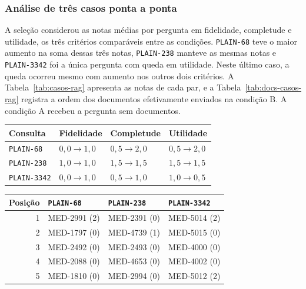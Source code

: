 \documentclass[12pt]{article}
\begin{document}
\subsubsection{Análise de três casos ponta a ponta}

A seleção considerou as notas médias por pergunta em fidelidade,
completude e utilidade, os três critérios comparáveis entre as condições.
\texttt{PLAIN-68} teve o maior aumento na soma dessas três notas,
\texttt{PLAIN-238} manteve as mesmas notas e \texttt{PLAIN-3342} foi a
única pergunta com queda em utilidade. Neste último caso, a queda ocorreu
mesmo com aumento nos outros dois critérios. A
Tabela~\ref{tab:casos-rag} apresenta as notas de cada par, e a
Tabela~\ref{tab:docs-casos-rag} registra a ordem dos documentos efetivamente
enviados na condição B. A condição A recebeu a pergunta sem documentos.

\noindent\begin{minipage}{\linewidth}
\centering
\small
{}
\label{tab:casos-rag}
\begin{tabular}{@{}llll@{}}
\toprule
Consulta & Fidelidade & Completude & Utilidade \\
\midrule
\texttt{PLAIN-68}   & \(0{,}0 \to 1{,}0\) & \(0{,}5 \to 2{,}0\) & \(0{,}5 \to 2{,}0\) \\
\texttt{PLAIN-238}  & \(1{,}0 \to 1{,}0\) & \(1{,}5 \to 1{,}5\) & \(1{,}5 \to 1{,}5\) \\
\texttt{PLAIN-3342} & \(0{,}0 \to 1{,}0\) & \(0{,}5 \to 1{,}0\) & \(1{,}0 \to 0{,}5\) \\
\bottomrule
\end{tabular}
\end{minipage}
\par\medskip

\noindent\begin{minipage}{\linewidth}
\centering
\small
{}
\label{tab:docs-casos-rag}
\begin{tabular}{@{}rlll@{}}
\toprule
Posição & \texttt{PLAIN-68} & \texttt{PLAIN-238} & \texttt{PLAIN-3342} \\
\midrule
1 & MED-2991 (2) & MED-2391 (0) & MED-5014 (2) \\
2 & MED-1797 (0) & MED-4739 (1) & MED-5015 (0) \\
3 & MED-2492 (0) & MED-2493 (0) & MED-4000 (0) \\
4 & MED-2088 (0) & MED-4653 (0) & MED-4002 (0) \\
5 & MED-1810 (0) & MED-2994 (0) & MED-5012 (2) \\
\bottomrule
\end{tabular}
\end{minipage}
\par\medskip
\end{document}
